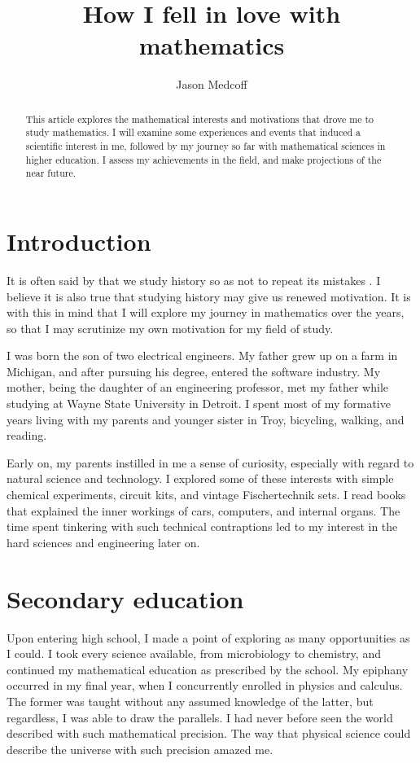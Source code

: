 \documentclass[12pt]{amsart}
\title{How I fell in love with mathematics}
\author{Jason Medcoff}
\begin{document}
\begin{abstract}
This article explores the mathematical interests and motivations that drove me to study mathematics. I will examine some experiences and events that induced a scientific interest in me, followed by my journey so far with mathematical sciences in higher education. I assess my achievements in the field, and make projections of the near future.
\end{abstract}


\maketitle
\tableofcontents

\section{Introduction}

It is often said by \cite{santayana-1} that we study history so as not to repeat its mistakes . I believe it is also true that studying history may give us renewed motivation. It is with this in mind that I will explore my journey in mathematics over the years, so that I may scrutinize my own motivation for my field of study.

I was born the son of two electrical engineers. My father grew up on a farm in Michigan, and after pursuing his degree, entered the software industry. My mother, being the daughter of an engineering professor, met my father while studying at Wayne State University in Detroit. I spent most of my formative years living with my parents and younger sister in Troy, bicycling, walking, and reading.

Early on, my parents instilled in me a sense of curiosity, especially with regard to natural science and technology. I explored some of these interests with simple chemical experiments, circuit kits, and vintage Fischertechnik sets. I read books that explained the inner workings of cars, computers, and internal organs. The time spent tinkering with such technical contraptions led to my interest in the hard sciences and engineering later on.

\section{Secondary education}

Upon entering high school, I made a point of exploring as many opportunities as I could. I took every science available, from microbiology to chemistry, and continued my mathematical education as prescribed by the school. My epiphany occurred in my final year, when I concurrently enrolled in physics and calculus. The former was taught without any assumed knowledge of the latter, but regardless, I was able to draw the parallels. I had never before seen the world described with such mathematical precision. The way that physical science could describe the universe with such precision amazed me.
\end{document}
